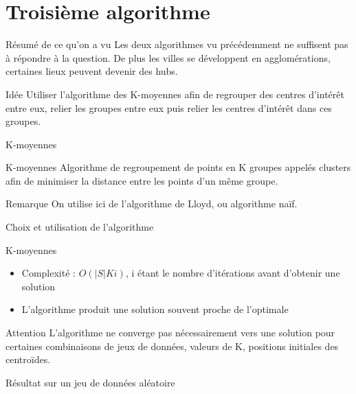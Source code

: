 \documentclass[aspectratio=43,11pt]{beamer}
\begin{document}
\section{Troisième algorithme}

\begin{frame}{Résumé de ce qu'on a vu}
    Les deux algorithmes vu précédemment ne suffisent pas à répondre à la question.
    De plus les villes se développent en agglomérations, certaines lieux peuvent devenir des hubs.
\end{frame}

\begin{frame}{Idée}
    Utiliser l'algorithme des K-moyennes afin de regrouper des centres d'intérêt entre eux, relier les groupes entre eux puis relier les centres d'intérêt dans ces groupes.
\end{frame}
\begin{frame}{K-moyennes}
    \begin{block}{K-moyennes}
        Algorithme de regroupement de points en K groupes appelés clusters afin de minimiser la distance entre les points d'un même groupe.
    \end{block}
    \begin{exampleblock}{Remarque}
        On utilise ici de l'algorithme de Lloyd, ou algorithme naïf.
    \end{exampleblock}
\end{frame}
\begin{frame}{Choix et utilisation de l'algorithme}
\end{frame}
\begin{frame}{K-moyennes}
    \begin{itemize}
        \item Complexité : $O(|S| K i)$, i étant le nombre d'itérations avant d'obtenir une solution
        \item L'algorithme produit une solution souvent proche de l'optimale
    \end{itemize}
    \begin{alertblock}{Attention}
        L'algorithme ne converge pas nécessairement vers une solution pour certaines combinaisons de jeux de données, valeurs de K, positions initiales des centroïdes.
    \end{alertblock}
\end{frame}
\begin{frame}{Résultat sur un jeu de données aléatoire}
\end{frame}
\end{document}
